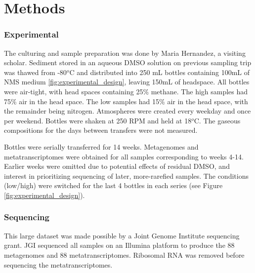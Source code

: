 \section{Methods}

\subsubsection{Experimental}  %
The culturing and sample preparation was done by Maria Hernandez, a visiting scholar.
Sediment stored in an aqueous DMSO solution on previous sampling trip was thawed from -80$^o$C and distributed into 250 mL bottles containing 100mL of NMS medium \ref{fig:experimental_design}, leaving 150mL of headspace.
All bottles were air-tight, with head spaces containing 25\% methane.
The high  samples had 75\% air in the head space.
The low  samples had 15\% air in the head space, with the remainder being nitrogen.
Atmospheres were created every weekday and once per weekend.
Bottles were shaken at 250 RPM and held at 18$^o$C.
The gaseous compositions for the days between transfers were not measured.

Bottles were serially transferred for 14 weeks.
Metagenomes and metatranscriptomes were obtained for all samples corresponding to weeks 4-14.
Earlier weeks were omitted due to potential effects of residual DMSO, and interest in prioritizing sequencing of later, more-rarefied samples.
The  conditions (low/high) were switched for the last 4 bottles in each series (see Figure \ref{fig:experimental_design}).

\subsubsection{Sequencing}
This large dataset was made possible by a Joint Genome Institute sequencing grant. %
JGI sequenced all samples on an Illumina platform to produce the 88 metagenomes and 88 metatranscriptomes.
Ribosomal RNA was removed before sequencing the metatranscriptomes.

